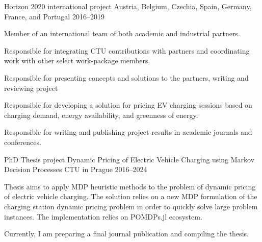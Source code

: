 

\begin{cventries}

  \cventry
    {Horizon 2020 international project} %
    {} %
    {Austria, Belgium, Czechia, Spain,  Germany, France, and Portugal} %
    {2016--2019} %
    {
      \begin{cvitems} %
        \item {Member of an international team of both academic and industrial partners.}
        \item {Responsible for integrating CTU contributions with partners and coordinating work with other select work-package members.}
        \item {Responsible for presenting concepts and solutions to the partners, writing and reviewing project }
        \item {Responsible for developing a solution for pricing EV charging sessions based on charging demand, energy availability, and greenness of energy.}
        \item {Responsible for writing and publishing project results in academic journals and conferences.}
      \end{cvitems}
    }

  \cventry
    {PhD Thesis project} %
    {Dynamic Pricing of Electric Vehicle Charging using Markov Decision Processes} %
    {CTU in Prague} %
    {2016--2024} %
    {
      \begin{cvitems} %
        \item {Thesis aims to apply MDP heuristic methods to the problem of dynamic pricing of electric vehicle charging. The solution relies on a new MDP formulation of the charging station dynamic pricing problem in order to quickly solve large problem instances. The implementation relies on POMDPs.jl ecosystem.}
        \item {Currently, I am preparing a final journal publication and compiling the thesis.}
      \end{cvitems}
    }


\end{cventries}
